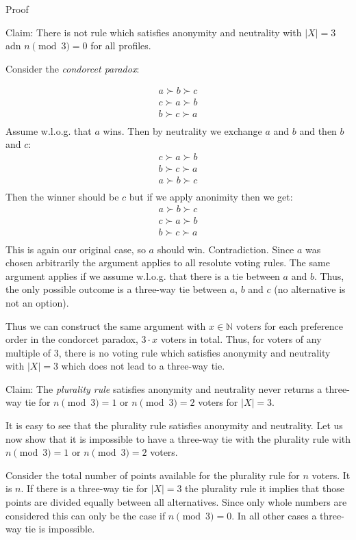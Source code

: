 \documentclass[12pt]{article}
\newcommand{\N}{\mathbb{N}}
\newenvironment{answer}[2][Answer]{\begin{trivlist}
\item[\hskip \labelsep {\bfseries #1}\hskip \labelsep {\bfseries #2:}]}{\end{trivlist}}
\begin{document}
\begin{answer}{a)}{Proof}

Claim: There is not rule which satisfies anonymity and neutrality with $|X|=3$ adn $n\pmod 3=0$ for all profiles.

Consider the \textit{condorcet paradox}:

\begin{align*}
a \succ b \succ c \\
c \succ a \succ b \\
b \succ c \succ a \\
\end{align*}
Assume w.l.o.g. that $a$ wins. Then by neutrality we exchange $a$ and $b$ and then $b$ and $c$:
\begin{align*}
c \succ a \succ b \\
b \succ c \succ a \\
a \succ b \succ c \\
\end{align*}
Then the winner should be $c$ but if we apply anonimity then we get:
\begin{align*}
a \succ b \succ c \\
c \succ a \succ b \\
b \succ c \succ a \\
\end{align*}
This is again our original case, so $a$ should win. Contradiction. Since $a$ was chosen arbitrarily the argument applies to all resolute voting rules. The same argument applies if we assume w.l.o.g. that there is a tie between $a$ and $b$. Thus, the only possible outcome is a three-way tie between $a$, $b$ and $c$ (no alternative is not an option).

Thus we can construct the same argument with $x \in \N$ voters for each preference order in the condorcet paradox, $3 \cdot x$ voters in total. Thus, for voters of any multiple of $3$, there is no voting rule which satisfies anonymity and neutrality with $|X|=3$ which does not lead to a three-way tie.

Claim: The \textit{plurality rule} satisfies anonymity and neutrality never returns a three-way tie for $n\pmod 3=1$ or $n\pmod 3=2$ voters for $|X|=3$.

It is easy to see that the plurality rule satisfies anonymity and neutrality. Let us now show that it is impossible to have a three-way tie with the plurality rule with $n\pmod 3=1$ or $n\pmod 3=2$ voters.

Consider the total number of points available for the plurality rule for $n$ voters. It is $n$. If there is a three-way tie for $|X|=3$ the plurality rule it implies that those points are divided equally between all alternatives. Since only whole numbers are considered this can only be the case if $n\pmod 3=0$. In all other cases a three-way tie is impossible.
\end{answer}
\end{document}

